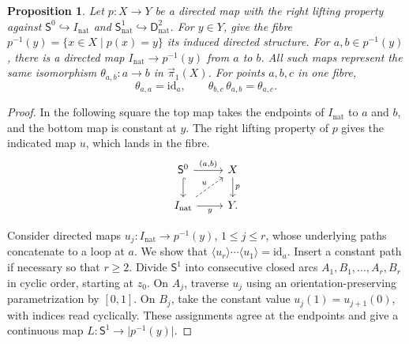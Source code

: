 \documentclass[12pt,a4paper]{amsart}
\newtheorem{proposition}[theorem]{Proposition}
\theoremstyle{definition}
\renewcommand{\leq}{\leqslant}
\renewcommand{\geq}{\geqslant}
\renewcommand{\vec}{\overrightarrow}
\newcommand{\rev}[1]{#1_{\mathrm{nat}}}
\newcommand{\Iv}{\rev{I}}
\newcommand{\abs}[1]{\lvert#1\rvert}
\newcommand{\PiC}{\vec{\pi}_1}
\newcommand{\clp}[1]{\langle #1\rangle}
\begin{document}
\begin{proposition}\label{prop:fibre-transport}
Let $p\colon X\to Y$ be a directed map with the right lifting property against $\mathsf{S}^0\hookrightarrow\Iv$ and $\rev{\mathsf{S}^1}\hookrightarrow\rev{\mathsf{D}^2}$. For $y\in Y$, give the fibre $p^{-1}(y)=\{x\in X\mid p(x)=y\}$ its induced directed structure. For $a,b\in p^{-1}(y)$, there is a directed map $\Iv\to p^{-1}(y)$ from $a$ to $b$. All such maps represent the same isomorphism $\theta_{a,b}\colon a\to b$ in $\PiC(X)$. For points $a,b,c$ in one fibre,
\[
 \theta_{a,a}=\mathrm{id}_a,\qquad \theta_{b,c}\,\theta_{a,b}=\theta_{a,c}.
\]
\end{proposition}
\begin{proof}
In the following square the top map takes the endpoints of $\Iv$ to $a$ and $b$, and the bottom map is constant at $y$. The right lifting property of $p$ gives the indicated map $u$, which lands in the fibre.
\[
\begin{tikzcd}
 \mathsf{S}^0\ar[r,"{(a,b)}"]\ar[d,hook]&X\ar[d,"p"]\\
 \Iv\ar[r,"y"']\ar[ur,dashed,"u"]&Y .
\end{tikzcd}
\]

Consider directed maps $u_j\colon\Iv\to p^{-1}(y)$, $1\leq j\leq r$, whose underlying paths concatenate to a loop at $a$. We show that $\clp{u_r}\cdots\clp{u_1}=\mathrm{id}_a$. Insert a constant path if necessary so that $r\geq2$. Divide $\mathsf{S}^1$ into consecutive closed arcs $A_1,B_1,\ldots,A_r,B_r$ in cyclic order, starting at $z_0$. On $A_j$, traverse $u_j$ using an orientation-preserving parametrization by $[0,1]$. On $B_j$, take the constant value $u_j(1)=u_{j+1}(0)$, with indices read cyclically. These assignments agree at the endpoints and give a continuous map $L\colon\mathsf{S}^1\to\abs{p^{-1}(y)}$.


\end{proof}
\end{document}
